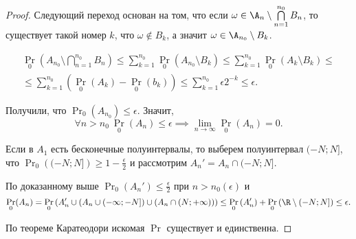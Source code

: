 \begin{proof}
    Следующий переход основан на том, что если \(\omega \in \A_n \setminus \bigcap\limits_{n=1}^{n_0}B_n \), то существует такой номер $ k $, что \(\omega \notin B_k\), а значит \(\omega \in \A_{n_0} \setminus B_k \).
    
    
    \begin{multline*} 
    \Pr_0\left(A_{n_0} \setminus \bigcap\limits_{n=1}^{n_0}B_n\right)
    \leq \sum\limits_{k=1}^{n_0}\Pr_0\left(A_{n_0} \setminus B_k \right) \leq \sum\limits_{k=1}^{n_0} \Pr_0\left(A_k \setminus B_k \right) \leq \\ \leq
    \sum\limits_{k=1}^{n_0} \left( \Pr_0\left(A_k\right) - \Pr_0\left(b_k\right) \right) \leq 
    \sum\limits_{k=1}^{n_0}\epsilon2^{-k} \leq \epsilon.
    \end{multline*}
    
    Получили, что \(\Pr_0(A_{n_0}) \leq \epsilon\). Значит, 
    \[
        \forall n > n_0 \ \Pr_0(A_n) \leq \epsilon \implies  \lim\limits_{n \to \infty}\Pr_0(A_n) = 0.
    \]
    
   Если в $ A_1 $ есть бесконечные полуинтервалы, то выберем полуинтервал $ (-N; N] $, что \(\Pr_0\left((-N; N] \right) \geq 1 - \frac{\epsilon}{2}\) и рассмотрим \(A_n' = A_n \cap (-N; N].  \)
   
   По доказанному выше \(\Pr_0(A_n') \leq \frac{\epsilon}{2} \) при $ n > n_0(\epsilon) $ и 
   \[
       \Pr_0(A_n) = \Pr_0\left(A_n' \cup \left(A_n \cup (-\infty; -N] \right) \cup \left(A_n \cap (N; +\infty)  \right)  \right) \leq \Pr_0\left(A_n'\right) + \Pr_0\left(\R \setminus (-N; N] \right) \leq \epsilon.
   \]
   
   По теореме Каратеодори искомая $ \Pr $ существует и единственна.

\end{proof}